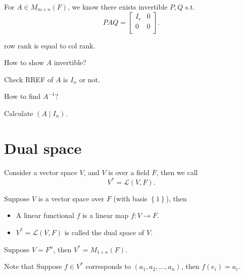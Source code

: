 \begin{corollary}
    For \(A \in M_{m \times n}(F)\), we know there exists invertible \(P, Q\) s.t. 
    \[
        PAQ = \begin{bmatrix}
            I_r & 0  \\
            0 & 0  \\
        \end{bmatrix}.
    \]  
\end{corollary}

\begin{corollary}
    row rank is equal to col rank.
\end{corollary}

\begin{question}
    How to show \(A\) invertible? 
\end{question}
\begin{answer}
    Check RREF of \(A\) is \(I_n\) or not.  
\end{answer}

\begin{question}
    How to find \(A^{-1}\)? 
\end{question}
\begin{answer}
    Calculate \((A \mid I_n)\). 
\end{answer}

\chapter{Dual space}
Consider a vector space \(V\), and \(V\) is over a field \(F\), then we call 
\[
    V^* = \mathcal{L} (V, F).
\]   

\begin{definition}
    Suppose \(V\) is a vector space over \(F\) (with basis \(\left\{ 1 \right\} \)), then 
    \begin{itemize}
        \item A linear functional \(f\) is a linear map \(f: V \to F\). 
        \item \(V^* = \mathcal{L} (V, F)\) is called the dual space of \(V\).     
    \end{itemize}  
\end{definition}

\begin{eg}
    Suppose \(V = F^n\), then \(V^* = M_{1 \times n}(F)\).  
\end{eg}
Note that Suppose \(f \in V^*\) corresponds to \((a_1, a_2, \dots , a_n)\), then \(f(e_i) = a_i\). 

